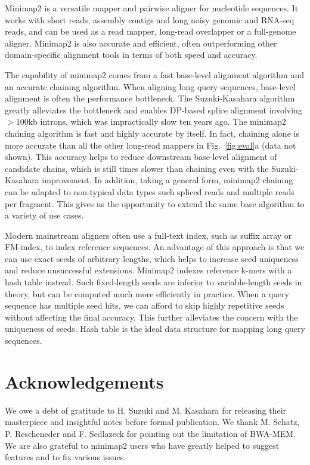 \documentclass{bioinfo}
\begin{document}
Minimap2 is a versatile mapper and pairwise aligner for nucleotide sequences.
It works with short reads, assembly contigs and long noisy genomic and RNA-seq
reads, and can be used as a read mapper, long-read overlapper or a full-genome
aligner. Minimap2 is also accurate and efficient, often outperforming other
domain-specific alignment tools in terms of both speed and accuracy.

The capability of minimap2 comes from a fast base-level alignment algorithm and
an accurate chaining algorithm. When aligning long query sequences, base-level
alignment is often the performance bottleneck. The Suzuki-Kasahara algorithm
greatly alleviates the bottleneck and enables DP-based splice alignment
involving $>$100kb introns, which was impractically slow ten years ago.  The
minimap2 chaining algorithm is fast and highly accurate by itself.  In fact,
chaining alone is more accurate than all the other long-read mappers in
Fig.~\ref{fig:eval}a (data not shown). This accuracy helps to reduce downstream
base-level alignment of candidate chains, which is still times slower than
chaining even with the Suzuki-Kasahara improvement. In addition, taking a
general form, minimap2 chaining can be adapted to non-typical data types such
spliced reads and multiple reads per fragment. This gives us the opportunity to
extend the same base algorithm to a variety of use cases.

Modern mainstream aligners often use a full-text index, such as suffix array or
FM-index, to index reference sequences. An advantage of this approach is that
we can use exact seeds of arbitrary lengths, which helps to increase seed
uniqueness and reduce unsuccessful extensions. Minimap2 indexes reference
k-mers with a hash table instead. Such fixed-length seeds are inferior to
variable-length seeds in theory, but can be computed much more efficiently in
practice. When a query sequence has multiple seed hits, we can afford to skip
highly repetitive seeds without affecting the final accuracy. This further
alleviates the concern with the uniqueness of seeds. Hash table is the ideal
data structure for mapping long query sequences.

\section*{Acknowledgements}
We owe a debt of gratitude to H. Suzuki and M. Kasahara for releasing their
masterpiece and insightful notes before formal publication. We thank M.
Schatz, P. Rescheneder and F. Sedlazeck for pointing out the limitation of
BWA-MEM. We are also grateful to minimap2 users who have greatly helped to
suggest features and to fix various issues.


\end{document}
